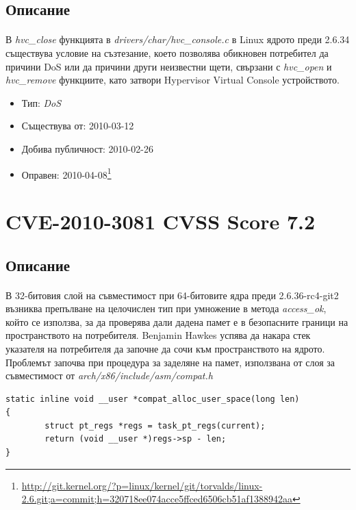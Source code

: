 \documentclass[a4paper,12pt,leqno]{article}
\begin{document}
\subsection{Описание}
\paragraph{}
В \textit{hvc\_close} функцията в \textit{drivers/char/hvc\_console.c} в Linux ядрото преди 2.6.34 съществува условие на съзтезание, което позволява обикновен потребител да причини DoS или да причини други неизвестни щети, свързани с \textit{hvc\_open} и \textit{hvc\_remove} функциите, като затвори Hypervisor Virtual Console устройството.

\begin{itemize}
    \item Тип: \textit{DoS}
    \item Съществува от: 2010-03-12
  	\item Добива публичност: 2010-02-26
    \item Оправен: 2010-04-08\footnote{\url{http://git.kernel.org/?p=linux/kernel/git/torvalds/linux-2.6.git;a=commit;h=320718ee074acce5ffced6506cb51af1388942aa}}
\end{itemize}

\section{CVE-2010-3081 CVSS Score 7.2}
\subsection{Описание}
\paragraph{}
В 32-битовия слой на съвместимост при 64-битовите ядра преди 2.6.36-rc4-git2 възниква препълване на целочислен тип при умножение в метода \textit{access\_ok}, който се използва, за да проверява дали дадена памет е в безопасните граници на пространството на потребителя. Benjamin Hawkes успява да накара стек указателя на потребителя да започне да сочи към пространството на ядрото. Проблемът започва при процедура за заделяне на памет, използвана от слоя за съвместимост от \textit{arch/x86/include/asm/compat.h}

\begin{verbatim}
static inline void __user *compat_alloc_user_space(long len)                    
{                                                                               
        struct pt_regs *regs = task_pt_regs(current);                           
        return (void __user *)regs->sp - len;                                   
}
\end{verbatim}
\end{document}
